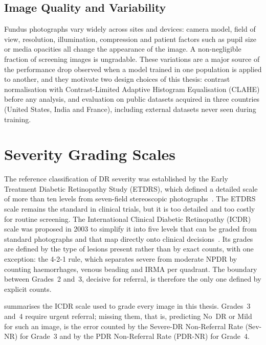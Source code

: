 \subsection{Image Quality and Variability}

Fundus photographs vary widely across sites and devices: camera model, field of view,
resolution, illumination, compression and patient factors such as pupil size or media
opacities all change the appearance of the image. A non-negligible fraction of screening
images is ungradable. These variations are a major source of the performance drop observed
when a model trained in one population is applied to another, and they motivate two
design choices of this thesis: contrast normalisation with Contrast-Limited Adaptive
Histogram Equalisation (CLAHE) before any analysis, and evaluation on public datasets
acquired in three countries (United States, India and France), including external
datasets never seen during training.

\section{Severity Grading Scales}
\label{sec:grading}

The reference classification of DR severity was established by the Early Treatment
Diabetic Retinopathy Study (ETDRS), which defined a detailed scale of more than ten levels
from seven-field stereoscopic photographs~\cite{etdrs1991grading}. The ETDRS scale remains
the standard in clinical trials, but it is too detailed and too costly for routine
screening. The International Clinical Diabetic Retinopathy (ICDR) scale was proposed in
2003 to simplify it into five levels that can be graded from standard
photographs and that map directly onto clinical decisions~\cite{wilkinson2003icdr}.
Its grades are defined by the type of lesions present rather than by exact counts, with one
exception: the 4-2-1 rule, which separates severe from moderate NPDR by counting
haemorrhages, venous beading and IRMA per quadrant. The boundary between Grades~2 and~3,
decisive for referral, is therefore the only one defined by explicit counts.

 summarises the ICDR scale used to grade every image in this thesis.
Grades~3 and~4 require urgent referral; missing them, that is, predicting No~DR or Mild
for such an image, is the error counted by the Severe-DR Non-Referral Rate (Sev-NR) for
Grade~3 and by the PDR Non-Referral Rate (PDR-NR) for Grade~4.

